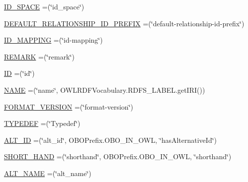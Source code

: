 \begin{DoxyCompactItemize}
\item 
\hyperlink{enumorg_1_1coode_1_1owlapi_1_1obo_1_1parser_1_1_o_b_o_vocabulary_af804b0a23a08f12e4be5a3928a20bbbd}{I\-D\-\_\-\-S\-P\-A\-C\-E} =(\char`\"{}id\-\_\-space\char`\"{})
\item 
\hyperlink{enumorg_1_1coode_1_1owlapi_1_1obo_1_1parser_1_1_o_b_o_vocabulary_adb6e72d6eb615fac914b449fdc950541}{D\-E\-F\-A\-U\-L\-T\-\_\-\-R\-E\-L\-A\-T\-I\-O\-N\-S\-H\-I\-P\-\_\-\-I\-D\-\_\-\-P\-R\-E\-F\-I\-X} =(\char`\"{}default-\/relationship-\/id-\/prefix\char`\"{})
\item 
\hyperlink{enumorg_1_1coode_1_1owlapi_1_1obo_1_1parser_1_1_o_b_o_vocabulary_a5cd818b76371eaf918c0e8b620983dc4}{I\-D\-\_\-\-M\-A\-P\-P\-I\-N\-G} =(\char`\"{}id-\/mapping\char`\"{})
\item 
\hyperlink{enumorg_1_1coode_1_1owlapi_1_1obo_1_1parser_1_1_o_b_o_vocabulary_a16879404fd61983238ae24aaca785e5e}{R\-E\-M\-A\-R\-K} =(\char`\"{}remark\char`\"{})
\item 
\hyperlink{enumorg_1_1coode_1_1owlapi_1_1obo_1_1parser_1_1_o_b_o_vocabulary_a634ff8c7929e10bf036fd9f6b4fee62a}{I\-D} =(\char`\"{}id\char`\"{})
\item 
\hyperlink{enumorg_1_1coode_1_1owlapi_1_1obo_1_1parser_1_1_o_b_o_vocabulary_a0f0d7706bab4cec2b8b68f6e6554394b}{N\-A\-M\-E} =(\char`\"{}name\char`\"{}, O\-W\-L\-R\-D\-F\-Vocabulary.\-R\-D\-F\-S\-\_\-\-L\-A\-B\-E\-L.\-get\-I\-R\-I())
\item 
\hyperlink{enumorg_1_1coode_1_1owlapi_1_1obo_1_1parser_1_1_o_b_o_vocabulary_a9d2850d3c9da7f633fcabb2990497070}{F\-O\-R\-M\-A\-T\-\_\-\-V\-E\-R\-S\-I\-O\-N} =(\char`\"{}format-\/version\char`\"{})
\item 
\hyperlink{enumorg_1_1coode_1_1owlapi_1_1obo_1_1parser_1_1_o_b_o_vocabulary_a96489fe88db1c079bc53f563123f9d92}{T\-Y\-P\-E\-D\-E\-F} =(\char`\"{}Typedef\char`\"{})
\item 
\hyperlink{enumorg_1_1coode_1_1owlapi_1_1obo_1_1parser_1_1_o_b_o_vocabulary_abca7ac3a323f4af63b47fcbf4ab8473c}{A\-L\-T\-\_\-\-I\-D} =(\char`\"{}alt\-\_\-id\char`\"{}, O\-B\-O\-Prefix.\-O\-B\-O\-\_\-\-I\-N\-\_\-\-O\-W\-L, \char`\"{}has\-Alternative\-Id\char`\"{})
\item 
\hyperlink{enumorg_1_1coode_1_1owlapi_1_1obo_1_1parser_1_1_o_b_o_vocabulary_a2e94d50e9213c7f47dbf705990f2109d}{S\-H\-O\-R\-T\-\_\-\-H\-A\-N\-D} =(\char`\"{}shorthand\char`\"{}, O\-B\-O\-Prefix.\-O\-B\-O\-\_\-\-I\-N\-\_\-\-O\-W\-L, \char`\"{}shorthand\char`\"{})
\item 
\hyperlink{enumorg_1_1coode_1_1owlapi_1_1obo_1_1parser_1_1_o_b_o_vocabulary_a95c235528ddd473486c6cba3419d54d9}{A\-L\-T\-\_\-\-N\-A\-M\-E} =(\char`\"{}alt\-\_\-name\char`\"{})

\end{DoxyCompactItemize}
